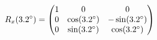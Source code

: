 \documentclass[preview]{standalone}
\begin{document}
\begin{align*}
\special{dvisvgm:raw <g id='unique000'>}R_x(3.2^\circ) = \begin{pmatrix} 1 & 0 & 0 \\ 0 & \cos(3.2^\circ) & -\sin(3.2^\circ) \\ 0 & \sin(3.2^\circ) & \cos(3.2^\circ) \end{pmatrix}\special{dvisvgm:raw </g>}
\end{align*}
\end{document}
